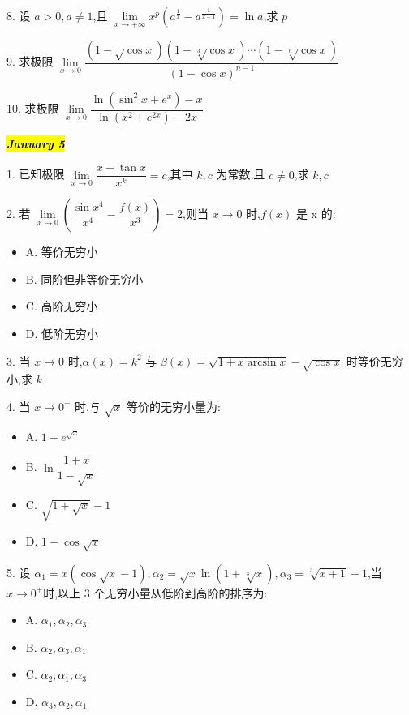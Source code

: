 8. 设 $a>0,a\neq 1$,且 $\lim\limits_{x\to +\infty}x^{p}(a^{\frac{1}{x}}-a^{\frac{1}{x+1}})=\ln a$,求 $p$
\begin{solution}
	
\end{solution}

9. 求极限 $\lim\limits_{x\to 0}\dfrac{(1-\sqrt{\cos x})(1-\sqrt[3]{\cos x})\cdots(1-\sqrt[n]{\cos x})}{(1-\cos x)^{n-1}}$
\begin{solution}
	
\end{solution}

10. 求极限 $\lim\limits_{x\to 0}\dfrac{\ln(\sin^{2}x+e^{x})-x}{\ln(x^{2}+e^{2x})-2x}$
\begin{solution}
	
\end{solution}

\hl{\textbf{\textit{January 5}}}

1. 已知极限 $\lim\limits_{x\to 0}\dfrac{x-\tan x}{x^{k}}=c$,其中 $k,c$ 为常数,且 $c\neq 0$,求 $k,c$

2. 若 $\lim\limits_{x\to 0}\left(\dfrac{\sin x^{4}}{x^{4}}-\dfrac{f(x)}{x^{3}}\right)=2$,则当 $x\to 0$ 时,$f(x)$ 是 x 的:
\begin{itemize}
	\item A. 等价无穷小
	\item B. 同阶但非等价无穷小
	\item C. 高阶无穷小
	\item D. 低阶无穷小
\end{itemize}

3. 当 $x\to 0$ 时,$\alpha(x)=k^{2}$ 与 $\beta(x)=\sqrt{1+x\arcsin x}-\sqrt{\cos x}$ 时等价无穷小,求 $k$

4. 当 $x\to 0^{+}$ 时,与 $\sqrt{x}$ 等价的无穷小量为:
\begin{itemize}
	\item A. $1-e^{\sqrt{x}}$
	\item B. $\ln\dfrac{1+x}{1-\sqrt{x}}$
	\item C. $\sqrt{1+\sqrt{x}}-1$
	\item D. $1-\cos \sqrt{x}$
\end{itemize}

5. 设 $\alpha_{1}=x(\cos\sqrt{x}-1),\alpha_{2}=\sqrt{x}\ln(1+\sqrt[3]{x}),\alpha_{3}=\sqrt[3]{x+1}-1$,当 $x\to 0^{+}$时,以上 $3$ 个无穷小量从低阶到高阶的排序为:
\begin{itemize}
	\item A. $\alpha_{1},\alpha_{2},\alpha_{3}$
	\item B. $\alpha_{2},\alpha_{3},\alpha_{1}$
	\item C. $\alpha_{2},\alpha_{1},\alpha_{3}$
	\item D. $\alpha_{3},\alpha_{2},\alpha_{1}$
\end{itemize}

